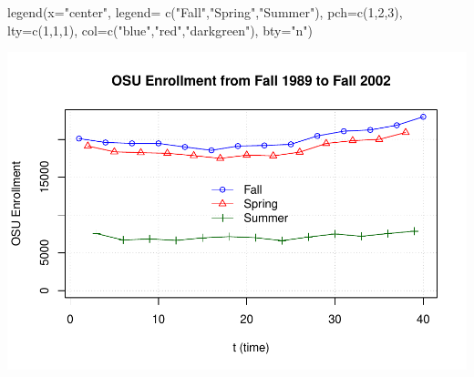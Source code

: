 \documentclass[
]{book}
\newenvironment{Shaded}{\begin{snugshade}}{\end{snugshade}}
\newcommand{\AttributeTok}[1]{\textcolor[rgb]{0.77,0.63,0.00}{#1}}
\newcommand{\DecValTok}[1]{\textcolor[rgb]{0.00,0.00,0.81}{#1}}
\newcommand{\FunctionTok}[1]{\textcolor[rgb]{0.00,0.00,0.00}{#1}}
\newcommand{\NormalTok}[1]{#1}
\newcommand{\StringTok}[1]{\textcolor[rgb]{0.31,0.60,0.02}{#1}}
\begin{document}
\begin{Shaded}
\begin{Highlighting}[]
\FunctionTok{legend}\NormalTok{(}\AttributeTok{x=}\StringTok{"center"}\NormalTok{, }\AttributeTok{legend=} \FunctionTok{c}\NormalTok{(}\StringTok{"Fall"}\NormalTok{,}\StringTok{"Spring"}\NormalTok{,}\StringTok{"Summer"}\NormalTok{), }\AttributeTok{pch=}\FunctionTok{c}\NormalTok{(}\DecValTok{1}\NormalTok{,}\DecValTok{2}\NormalTok{,}\DecValTok{3}\NormalTok{), }\AttributeTok{lty=}\FunctionTok{c}\NormalTok{(}\DecValTok{1}\NormalTok{,}\DecValTok{1}\NormalTok{,}\DecValTok{1}\NormalTok{), }\AttributeTok{col=}\FunctionTok{c}\NormalTok{(}\StringTok{"blue"}\NormalTok{,}\StringTok{"red"}\NormalTok{,}\StringTok{"darkgreen"}\NormalTok{), }\AttributeTok{bty=}\StringTok{"n"}\NormalTok{)}
\end{Highlighting}
\end{Shaded}

\includegraphics{02-Time-Series-Basics_files/figure-latex/unnamed-chunk-8-1.pdf}
\end{document}
